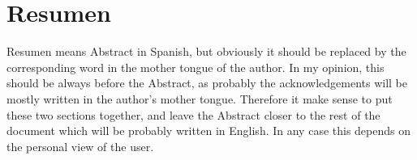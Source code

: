 \chapter*{Resumen} 
Resumen means Abstract in Spanish, but obviously it should be replaced by the corresponding word in the mother tongue of the author. In my opinion, this should be always before the Abstract, as probably the acknowledgements will be mostly written in the author's mother tongue. Therefore it make sense to put these two sections together, and leave the Abstract closer to the rest of the document which will be probably written in English. In any case this depends on the personal view of the user.